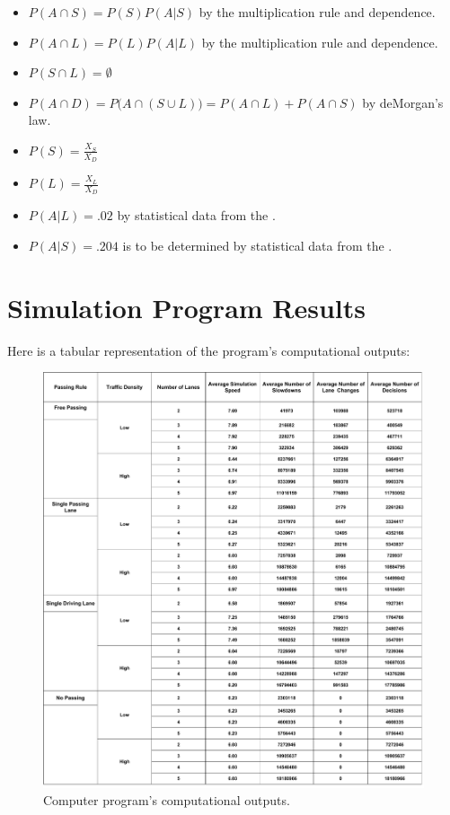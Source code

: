 \documentclass{amsart}
\begin{document}
			\begin{itemize}
				\item $P(A \cap S) = P(S)P(A|S)$ by the multiplication rule and dependence.
				\item $P(A \cap L) = P(L)P(A|L)$ by the multiplication rule and dependence.
				\item $P(S \cap L) = \emptyset$
				\item $P(A \cap D) = P\big(A \cap (S \cup L)\big)= P(A \cap L) + P(A \cap S)$ by deMorgan's law.
				\item $P(S) = \frac{X_S}{X_D}$
				\item $P(L) = \frac{X_L}{X_D}$
				\item $P(A|L)= .02$  by statistical data from the \cite{GovStats}.
				\item $P(A|S)= .204$ is to be determined by statistical data from the \cite{GovStats}.
			\end{itemize}
		
\section{\bfseries{Simulation Program Results}}

	Here is a tabular representation of the program's computational outputs:

\begin{figure}[h]
	\centering
	\includegraphics[scale=0.3]{MCMDataSummary}
	\caption{Computer program's computational outputs.}
	\label{MCMDataSummary}
	\end{figure}
\end{document}

